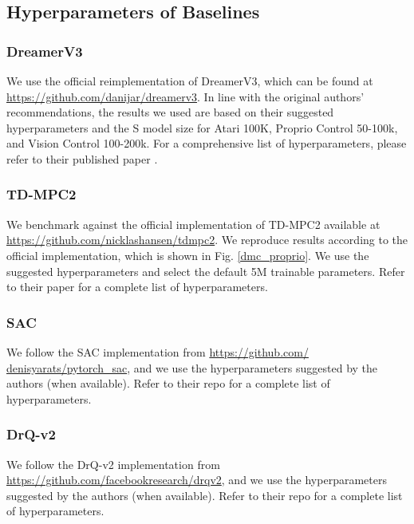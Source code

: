 \subsection{Hyperparameters of Baselines}

\subsubsection{DreamerV3}
We use the official reimplementation of DreamerV3, which can be found at \href{https://github.com/danijar/dreamerv3}{https://github.com/danijar/dreamerv3}. In line with the original authors' recommendations, the results we used are based on their suggested hyperparameters and the S model size for Atari 100K, Proprio Control 50-100k, and Vision Control 100-200k. For a comprehensive list of hyperparameters, please refer to their published paper \citep{hafner2023mastering}.

\subsubsection{TD-MPC2}
We benchmark against the official implementation of TD-MPC2 available at
\href{https://github.com/nicklashansen/tdmpc2}{https://github.com/nicklashansen/tdmpc2}. 
We reproduce results according to the official implementation, which is shown in Fig. \ref{dmc_proprio}. We use the suggested hyperparameters and select the default 5M trainable parameters. Refer to their paper \citep{Anonymous2023TDMPC2} for a complete list of hyperparameters.

\subsubsection{SAC}
We follow the SAC implementation from \href{https://github.com/ denisyarats/pytorch\_sac}{https://github.com/ denisyarats/pytorch\_sac}, and we use the hyperparameters suggested by the authors (when available). Refer to their repo for a complete list of hyperparameters. 


\subsubsection{DrQ-v2}
We follow the DrQ-v2 implementation from \href{https://github.com/facebookresearch/drqv2}{https://github.com/facebookresearch/drqv2}, and we use the hyperparameters suggested by the authors (when available). Refer to their repo for a complete list of hyperparameters. 


